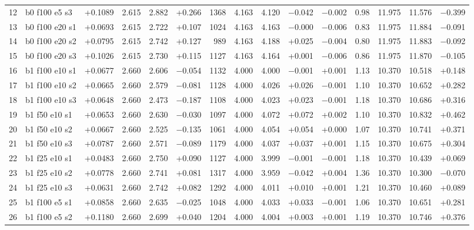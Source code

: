 \documentclass[10pt,a4paper]{article}
\begin{document}
\begin{landscape}
\begin{table}[h!]
\begin{tabular}{rlrrrrrrrrrrrrr}
12 & b0 f100 e5 s3 & +0.1089 & 2.615 & 2.882 & +0.266 & 1368 & 4.163 & 4.120 & $-$0.042 & $-$0.002 & 0.98 & 11.975 & 11.576 & $-$0.399\\
13 & b0 f100 e20 s1 & +0.0693 & 2.615 & 2.722 & +0.107 & 1024 & 4.163 & 4.163 & $-$0.000 & $-$0.006 & 0.83 & 11.975 & 11.884 & $-$0.091\\
14 & b0 f100 e20 s2 & +0.0795 & 2.615 & 2.742 & +0.127 & 989 & 4.163 & 4.188 & +0.025 & $-$0.004 & 0.80 & 11.975 & 11.883 & $-$0.092\\
15 & b0 f100 e20 s3 & +0.1026 & 2.615 & 2.730 & +0.115 & 1127 & 4.163 & 4.164 & +0.001 & $-$0.006 & 0.86 & 11.975 & 11.870 & $-$0.105\\
\midrule
16 & b1 f100 e10 s1 & +0.0677 & 2.660 & 2.606 & $-$0.054 & 1132 & 4.000 & 4.000 & $-$0.001 & +0.001 & 1.13 & 10.370 & 10.518 & +0.148\\
17 & b1 f100 e10 s2 & +0.0665 & 2.660 & 2.579 & $-$0.081 & 1128 & 4.000 & 4.026 & +0.026 & $-$0.001 & 1.10 & 10.370 & 10.652 & +0.282\\
18 & b1 f100 e10 s3 & +0.0648 & 2.660 & 2.473 & $-$0.187 & 1108 & 4.000 & 4.023 & +0.023 & $-$0.001 & 1.18 & 10.370 & 10.686 & +0.316\\
19 & b1 f50 e10 s1 & +0.0653 & 2.660 & 2.630 & $-$0.030 & 1097 & 4.000 & 4.072 & +0.072 & +0.002 & 1.10 & 10.370 & 10.832 & +0.462\\
20 & b1 f50 e10 s2 & +0.0667 & 2.660 & 2.525 & $-$0.135 & 1061 & 4.000 & 4.054 & +0.054 & +0.000 & 1.07 & 10.370 & 10.741 & +0.371\\
21 & b1 f50 e10 s3 & +0.0787 & 2.660 & 2.571 & $-$0.089 & 1179 & 4.000 & 4.037 & +0.037 & +0.001 & 1.15 & 10.370 & 10.675 & +0.304\\
22 & b1 f25 e10 s1 & +0.0483 & 2.660 & 2.750 & +0.090 & 1127 & 4.000 & 3.999 & $-$0.001 & $-$0.001 & 1.18 & 10.370 & 10.439 & +0.069\\
23 & b1 f25 e10 s2 & +0.0778 & 2.660 & 2.741 & +0.081 & 1317 & 4.000 & 3.959 & $-$0.042 & +0.004 & 1.36 & 10.370 & 10.300 & $-$0.070\\
24 & b1 f25 e10 s3 & +0.0631 & 2.660 & 2.742 & +0.082 & 1292 & 4.000 & 4.011 & +0.010 & +0.001 & 1.21 & 10.370 & 10.460 & +0.089\\
25 & b1 f100 e5 s1 & +0.0858 & 2.660 & 2.635 & $-$0.025 & 1048 & 4.000 & 4.033 & +0.033 & $-$0.001 & 1.06 & 10.370 & 10.651 & +0.281\\
26 & b1 f100 e5 s2 & +0.1180 & 2.660 & 2.699 & +0.040 & 1204 & 4.000 & 4.004 & +0.003 & +0.001 & 1.19 & 10.370 & 10.746 & +0.376\\

\end{tabular}
\end{table}
\end{landscape}
\end{document}
